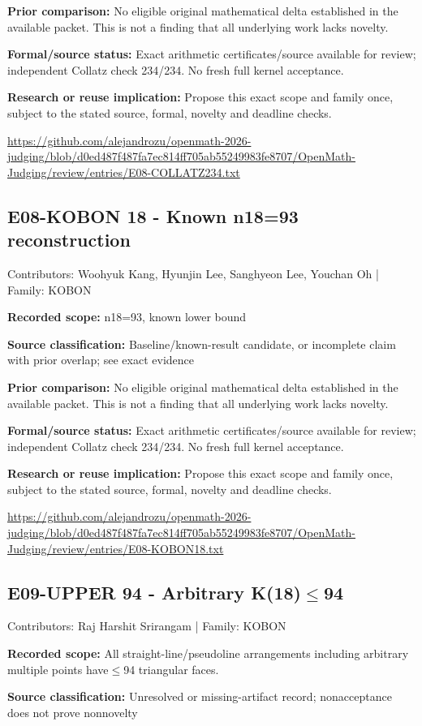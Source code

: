 \documentclass[11pt,a4paper]{article}
\begin{document}
\textbf{Prior comparison:} No eligible original mathematical delta established in the available packet. This is not a finding that all underlying work lacks novelty.

\textbf{Formal/source status:} Exact arithmetic certificates/source available for review; independent Collatz check 234/234. No fresh full kernel acceptance.

\textbf{Research or reuse implication:} Propose this exact scope and family once, subject to the stated source, formal, novelty and deadline checks.

{\small \url{https://github.com/alejandrozu/openmath-2026-judging/blob/d0ed487f487fa7ec814ff705ab55249983fe8707/OpenMath-Judging/review/entries/E08-COLLATZ234.txt}\par}

\begin{samepage}
\subsection{E08-KOBON 18  -  Known n18=93 reconstruction}
{\small Contributors: Woohyuk Kang, Hyunjin Lee, Sanghyeon Lee, Youchan Oh | Family: KOBON\par}

\textbf{Recorded scope:} n18=93, known lower bound

\end{samepage}
\textbf{Source classification:} Baseline/known-result candidate, or incomplete claim with prior overlap; see exact evidence

\textbf{Prior comparison:} No eligible original mathematical delta established in the available packet. This is not a finding that all underlying work lacks novelty.

\textbf{Formal/source status:} Exact arithmetic certificates/source available for review; independent Collatz check 234/234. No fresh full kernel acceptance.

\textbf{Research or reuse implication:} Propose this exact scope and family once, subject to the stated source, formal, novelty and deadline checks.

{\small \url{https://github.com/alejandrozu/openmath-2026-judging/blob/d0ed487f487fa7ec814ff705ab55249983fe8707/OpenMath-Judging/review/entries/E08-KOBON18.txt}\par}

\begin{samepage}
\subsection{E09-UPPER 94  -  Arbitrary K(18)\ensuremath{\leq}94}
{\small Contributors: Raj Harshit Srirangam | Family: KOBON\par}

\textbf{Recorded scope:} All straight-line/pseudoline arrangements including arbitrary multiple points have\ensuremath{\leq}94 triangular faces.

\end{samepage}
\textbf{Source classification:} Unresolved or missing-artifact record; nonacceptance does not prove nonnovelty
\end{document}
